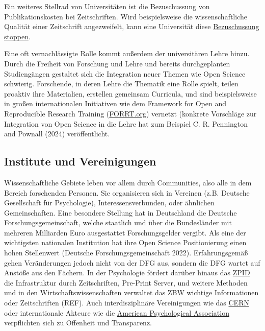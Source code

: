 \documentclass[
  letterpaper,
  DIV=11,
  numbers=noendperiod]{scrreprt}
\begin{document}
Ein weiteres Stellrad von Universitäten ist die Bezuschussung von
Publikationskosten bei Zeitschriften. Wird beispielsweise die
wissenschaftliche Qualität einer Zeitschrift angezweifelt, kann eine
Universität diese
\href{https://www.suub.uni-bremen.de/ueber-uns/neues-aus-der-suub/unter-kritischer-beobachtung-open-access-publikationen-im-mdpi-verlag}{Bezuschussung
stoppen}.

Eine oft vernachlässigte Rolle kommt außerdem der universitären Lehre
hinzu. Durch die Freiheit von Forschung und Lehre und bereits
durchgeplanten Studiengängen gestaltet sich die Integration neuer Themen
wie Open Science schwierig. Forschende, in deren Lehre die Thematik eine
Rolle spielt, teilen proaktiv ihre Materialien, erstellen gemeinsam
Curricula, und sind beispielsweise in großen internationalen Initiativen
wie dem Framework for Open and Reproducible Research Training
(\href{https://forrt.org}{FORRT.org}) vernetzt (konkrete Vorschläge zur
Integration von Open Science in die Lehre hat zum Beispiel C. R.
Pennington and Pownall (2024) veröffentlicht.

\subsection{Institute und
Vereinigungen}\label{institute-und-vereinigungen}

Wissenschaftliche Gebiete leben vor allem durch Communities, also alle
in dem Bereich forschenden Personen. Sie organisieren sich in Vereinen
(z.B. Deutsche Gesellschaft für Psychologie), Interessensverbunden, oder
ähnlichen Gemeinschaften. Eine besondere Stellung hat in Deutschland die
Deutsche Forschungsgemeinschaft, welche staatlich und über die
Bundesländer mit mehreren Milliarden Euro ausgestattet Forschungsgelder
vergibt. Als eine der wichtigsten nationalen Institution hat ihre Open
Science Positionierung einen hohen Stellenwert (Deutsche
Forschungsgemeinschaft 2022). Erfahrungsgemäß gehen Veränderungen jedoch
nicht von der DFG aus, sondern die DFG wartet auf Anstöße aus den
Fächern. In der Psychologie fördert darüber hinaus das
\href{https://leibniz-psychology.org/das-institut}{ZPID} die
Infrastruktur durch Zeitschriften, Pre-Print Server, und weitere
Methoden und in den Wirtschaftswissenschaften verwaltet das ZBW wichtige
Informationen oder Zeitschriften (REF). Auch interdisziplinäre
Vereinigungen wie das \href{https://openscience.cern}{CERN} oder
internationale Akteure wie die
\href{https://www.apa.org/pubs/journals/resources/publishing-tips/transparency-openness-promotion-guidelines?utm_campaign=apa_publishing&utm_medium=direct_email&utm_source=businessdevelopment&utm_content=openscience_promo_11302023&utm_term=text_middle_learnmore}{American
Psychological Association} verpflichten sich zu Offenheit und
Transparenz.
\end{document}
